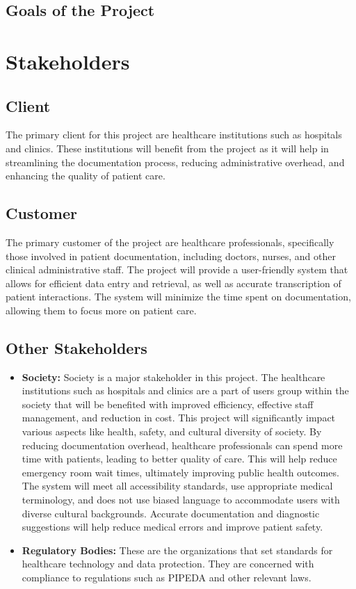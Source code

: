 \documentclass[12pt]{article}
\begin{document}
\subsection{Goals of the Project}

\section{Stakeholders}

\subsection{Client}
The primary client for this project are healthcare institutions such as hospitals and clinics. These institutions will benefit from the project as it will help in streamlining the documentation process, reducing administrative overhead, and enhancing the quality of patient care.

\subsection{Customer}
The primary customer of the project are healthcare professionals, specifically those involved in patient documentation, including doctors, nurses, and other clinical administrative staff. The project will provide a user-friendly system that allows for efficient data entry and retrieval, as well as accurate transcription of patient interactions. The system will minimize the time spent on documentation, allowing them to focus more on patient care.

\subsection{Other Stakeholders}
\begin{itemize}
  \item \textbf{Society:} Society is a major stakeholder in this project. The healthcare institutions such as hospitals and clinics are a part of users group within the society that will be benefited with improved efficiency, effective staff management, and reduction in cost. This project will significantly impact various aspects like health, safety, and cultural diversity of society. By reducing documentation overhead, healthcare professionals can spend more time with patients, leading to better quality of care. This will help reduce emergency room wait times, ultimately improving public health outcomes. The system will meet all accessibility standards, use appropriate medical terminology, and does not use biased language to accommodate users with diverse cultural backgrounds. Accurate documentation and diagnostic suggestions will help reduce medical errors and improve patient safety.

  \item \textbf{Regulatory Bodies:} These are the organizations that set standards for healthcare technology and data protection. They are concerned with compliance to regulations such as PIPEDA and other relevant laws.
\end{itemize}
\end{document}
